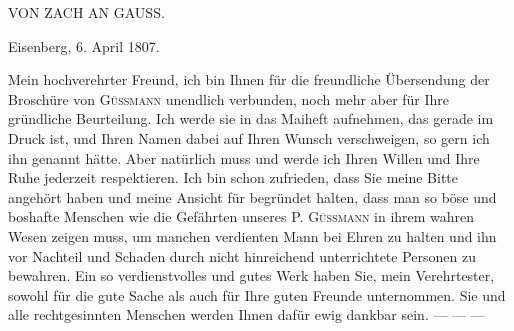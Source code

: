 \clearpage
\hypertarget{native-491-zach}{}
\label{native-491-zach}
\begin{center}
VON ZACH AN GAUSS.
\end{center}

\begin{flushright}Eisenberg, 6. April 1807.\end{flushright}

Mein hochverehrter Freund, ich bin Ihnen für die freundliche Übersendung der Broschüre von \textsc{Güssmann} unendlich verbunden, noch mehr aber für Ihre gründliche Beurteilung. Ich werde sie in das Maiheft aufnehmen, das gerade im Druck ist, und Ihren Namen dabei auf Ihren Wunsch verschweigen, so gern ich ihn genannt hätte. Aber natürlich muss und werde ich Ihren Willen und Ihre Ruhe jederzeit respektieren. Ich bin schon zufrieden, dass Sie meine Bitte angehört haben und meine Ansicht für begründet halten, dass man so böse und boshafte Menschen wie die Gefährten unseres P. \textsc{Güssmann} in ihrem wahren Wesen zeigen muss, um manchen verdienten Mann bei Ehren zu halten und ihn vor Nachteil und Schaden durch nicht hinreichend unterrichtete Personen zu bewahren. Ein so verdienstvolles und gutes Werk haben Sie, mein Verehrtester, sowohl für die gute Sache als auch für Ihre guten Freunde unternommen. Sie und alle rechtgesinnten Menschen werden Ihnen dafür ewig dankbar sein. --- --- ---
